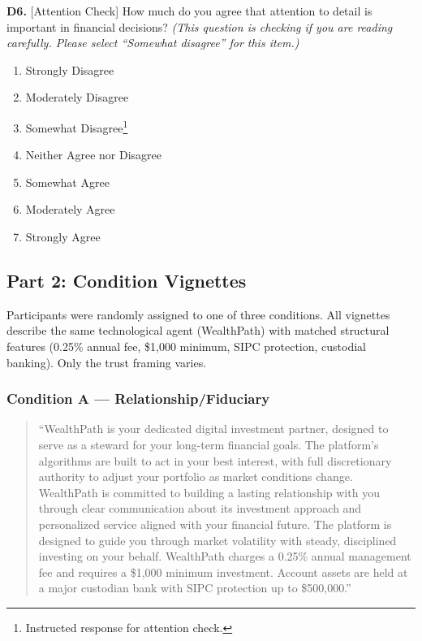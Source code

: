 \noindent\textbf{D6.} [Attention Check] How much do you agree that attention to detail is important in financial decisions? \textit{(This question is checking if you are reading carefully. Please select ``Somewhat disagree'' for this item.)}

\begin{enumerate}[label=\arabic*.]
  \item Strongly Disagree
  \item Moderately Disagree
  \item Somewhat Disagree\footnote{Instructed response for attention check.}
  \item Neither Agree nor Disagree
  \item Somewhat Agree
  \item Moderately Agree
  \item Strongly Agree
\end{enumerate}

\subsection{Part 2: Condition Vignettes}

Participants were randomly assigned to one of three conditions. All vignettes describe the same technological agent (WealthPath) with matched structural features (0.25\% annual fee, \$1,000 minimum, SIPC protection, custodial banking). Only the trust framing varies.

\subsubsection{Condition A --- Relationship/Fiduciary}

\begin{quote}
``WealthPath is your dedicated digital investment partner, designed to serve as a steward for your long-term financial goals. The platform's algorithms are built to act in your best interest, with full discretionary authority to adjust your portfolio as market conditions change. WealthPath is committed to building a lasting relationship with you through clear communication about its investment approach and personalized service aligned with your financial future. The platform is designed to guide you through market volatility with steady, disciplined investing on your behalf. WealthPath charges a 0.25\% annual management fee and requires a \$1,000 minimum investment. Account assets are held at a major custodian bank with SIPC protection up to \$500,000.''
\end{quote}

